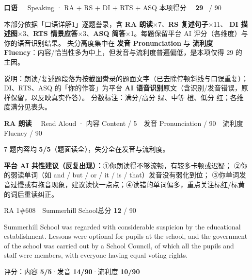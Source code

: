 \documentclass[11pt]{article}
\newcommand{\sfull}[1]{\textcolor{cFix}{\bfseries #1}}     %
\newcommand{\spart}[1]{\textcolor{cPartial}{\bfseries #1}} %
\newcommand{\szero}[1]{\textcolor{cWrong}{\bfseries #1}}   %
\newcommand{\ptesection}[3]{%
  \needspace{6\baselineskip}
  \begin{tcolorbox}[enhanced, colback=cAccent, colframe=cAccent, sharp corners,
     left=14pt, right=14pt, top=10pt, bottom=10pt, boxrule=0pt]
    {\fontsize{20}{24}\selectfont\bfseries\color{white} #1\ \ }%
    {\large\color{white!85} #2}\hfill
    {\large\color{white}本项得分\ \ }{\fontsize{22}{24}\selectfont\bfseries\color{white} #3}%
    \ {\color{white!85}/ 90}
  \end{tcolorbox}}
\newcommand{\ptetask}[2]{%
  \needspace{4\baselineskip}\medskip
  \begin{tcolorbox}[enhanced, colback=cHead, colframe=cHead, sharp corners,
     left=12pt, right=12pt, top=5pt, bottom=5pt, boxrule=0pt]
    {\large\bfseries\color{white} #1}\ \ {\color{white!80} #2}
  \end{tcolorbox}\smallskip}
\begin{document}
\ptesection{口语}{Speaking · RA + RS + DI + RTS + ASQ}{29}

\vspace{1mm}
{\small\color{gray} 本部分依据「口语详解1」逐题誊录，含 \textbf{RA 朗读}$\times$7、\textbf{RS 复述句子}$\times$11、
\textbf{DI 描述图}$\times$3、\textbf{RTS 情景应答}$\times$3、\textbf{ASQ 简答}$\times$1。每题保留平台 AI 评分（各维度）与你的语音识别结果。
失分高度集中在 \textbf{发音 Pronunciation} 与 \textbf{流利度 Fluency}：内容/恰当性多为中上，但发音与流利度普遍偏低，是本项仅得 29 的主因。}
\vspace{1mm}

\begin{notebox}
{\footnotesize 说明：朗读/复述题段落为按截图誊录的题面文字（已去除停顿斜线与口误重复）；
DI、RTS、ASQ 的「你的作答」为平台 \textbf{AI 语音识别}原文（含识别/发音错误，原样保留，以反映真实作答）。
分数标注：满分/高分 {\color{cFix}绿}、中等 {\color{cPartial}橙}、低分 {\color{cWrong}红}；各维度满分见表头。}
\end{notebox}

\ptetask{RA 朗读}{Read Aloud · 内容 Content / 5　发音 Pronunciation / 90　流利度 Fluency / 90}

{\small\color{gray} 7 题内容均 \sfull{5/5}（题面读全），失分全在发音与流利度。}\smallskip

\begin{notebox}
{\footnotesize\textbf{平台 AI 共性建议（反复出现）：}①你朗读得不够流畅，有较多卡顿或迟疑；
②你的弱读单词（如 and / but / or / it / is / that）发音没有弱化到位；
③你单词发音过慢或有拖音现象，建议读快一点点；④读错的单词偏多，重点关注标红/标黄的词后重读纠正。}
\end{notebox}

\begin{qblock}{RA 1\quad \#608\ \ Summerhill School}{总分 \textcolor{cAccent}{\bfseries 12} / 90}
\begin{promptbox}
Summerhill School was regarded with considerable suspicion by the educational establishment. Lessons were optional for pupils at the school, and the government of the school was carried out by a School Council, of which all the pupils and staff were members, with everyone having equal voting rights.
\end{promptbox}
{\small 评分：内容 \sfull{5/5}\quad·\quad 发音 \spart{14/90}\quad·\quad 流利度 \szero{10/90}}
\end{qblock}
\end{document}
